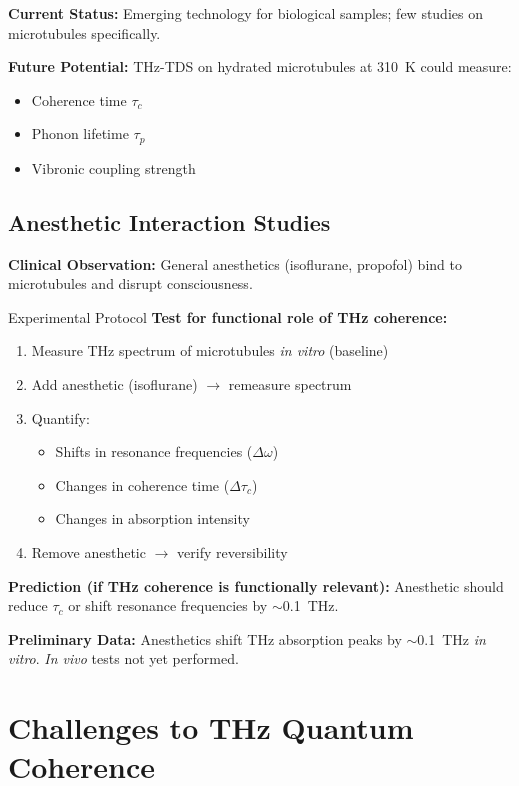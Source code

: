 \textbf{Current Status:} Emerging technology for biological samples; few studies on microtubules specifically.

\textbf{Future Potential:} THz-TDS on hydrated microtubules at 310~K could measure:
\begin{itemize}
\item Coherence time $\tau_c$
\item Phonon lifetime $\tau_p$  
\item Vibronic coupling strength
\end{itemize}

\subsection{Anesthetic Interaction Studies}
\label{subsec:app-anesthetics}

\textbf{Clinical Observation:} General anesthetics (isoflurane, propofol) bind to microtubules and disrupt consciousness.

\begin{calloutbox}{Experimental Protocol}
\textbf{Test for functional role of THz coherence:}

\begin{enumerate}
\item Measure THz spectrum of microtubules \textit{in vitro} (baseline)
\item Add anesthetic (isoflurane) $\rightarrow$ remeasure spectrum
\item Quantify:
  \begin{itemize}
  \item Shifts in resonance frequencies ($\Delta\omega$)
  \item Changes in coherence time ($\Delta\tau_c$)
  \item Changes in absorption intensity
  \end{itemize}
\item Remove anesthetic $\rightarrow$ verify reversibility
\end{enumerate}

\textbf{Prediction (if THz coherence is functionally relevant):} Anesthetic should reduce $\tau_c$ or shift resonance frequencies by $\sim$0.1~THz.

\textbf{Preliminary Data:} Anesthetics shift THz absorption peaks by $\sim$0.1~THz \textit{in vitro}. \textit{In vivo} tests not yet performed.
\end{calloutbox}

\section{Challenges to THz Quantum Coherence}\label{challenges-to-thz-quantum-coherence}

